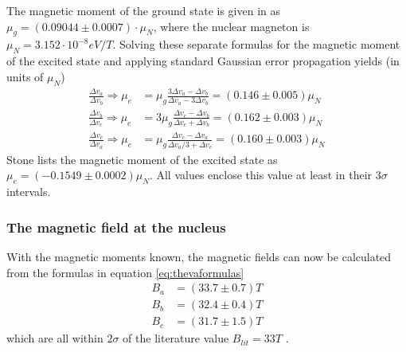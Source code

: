 The magnetic moment of the ground state is given in \cite{stone} as $\mu_g=(0.09044\pm0.0007)\cdot\mu_N$, where the nuclear magneton is $\mu_N=\unit{3.152\cdot10^{-8}}{eV/T}$. Solving these separate formulas for the magnetic moment of the excited state and applying standard Gaussian error propagation yields (in units of $\mu_N$)
\begin{align}
\frac{\Delta v_a}{\Delta v_b}\Rightarrow \mu_e&=\mu_g\frac{3\Delta v_a-\Delta v_b}{\Delta v_a-3\Delta v_b}=\unit{(0.146\pm0.005)}{\mu_N}\\
\frac{\Delta v_b}{\Delta v_c}\Rightarrow\mu_e&=3\mu_g\frac{\Delta v_c-\Delta v_b}{\Delta v_c+\Delta v_b}=\unit{(0.162\pm0.003)}{\mu_N}\\
\frac{\Delta v_c}{\Delta v_a}\Rightarrow\mu_e&=\mu_g\frac{\Delta v_c-\Delta v_a}{\Delta v_a/3+\Delta v_c}=\unit{(0.160\pm0.003)}{\mu_N}
\end{align}
Stone \cite{stone} lists the magnetic moment of the excited state as $\mu_e=\unit{(-0.1549\pm0.0002)}{\mu_N}$.
All values enclose this value at least in their $3\sigma$ intervals. 

\subsubsection{The magnetic field at the nucleus}
With the magnetic moments known, the magnetic fields can now be calculated from the formulas in equation \ref{eq:thevaformulas}
\begin{align}
	B_a&=\unit{(33.7\pm0.7)}{T}\\
	B_b&=\unit{(32.4\pm0.4)}{T}\\
	B_c&=\unit{(31.7\pm1.5)}{T}
\end{align}
which are all within $2\sigma$ of the literature value $B_{lit}=\unit{33}{T}$ \cite{Fultz}.
